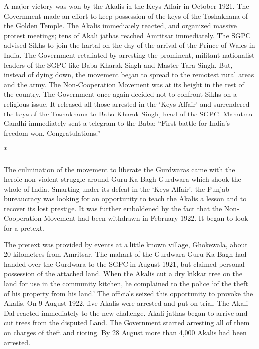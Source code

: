 \begin{multicols}{2}
A major victory was won by the Akalis in the Keys Affair in October 1921. The Government made an effort to keep possession of the keys of the Toshakhana of the Golden Temple. The Akalis immediately reacted, and organized massive protest meetings; tens of Akali jathas reached Amritsar immediately. The SGPC advised Sikhs to join the hartal on the day of the arrival of the Prince of Wales in India. The Government retaliated by arresting the prominent, militant nationalist leaders of the SGPC like Baba Kharak Singh and Master Tara Singh. But, instead of dying down, the movement began to spread to the remotest rural areas and the army. The Non-Cooperation Movement was at its height in the rest of the country. The Government once again decided not to confront Sikhs on a religious issue. It released all those arrested in the `Keys Affair' and surrendered the keys of the Toshakhana to Baba Kharak Singh, head of the SGPC. Mahatma Gandhi immediately sent a telegram to the Baba: ``First battle for India's freedom won. Congratulations.''

\begin{center}*\end{center}

\paragraph*{}
The culmination of the movement to liberate the Gurdwaras came with the heroic non-violent struggle around Guru-Ka-Bagh Gurdwara which shook the whole of India. Smarting under its defeat in the `Keys Affair', the Punjab bureaucracy was looking for an opportunity to teach the Akalis a lesson and to recover its lost prestige. It was further emboldened by the fact that the Non-Cooperation Movement had been withdrawn in February 1922. It began to look for a pretext.

The pretext was provided by events at a little known village, Ghokewala, about 20 kilometres from Amritsar. The mahant of the Gurdwara Guru-Ka-Bagh had handed over the Gurdwara to the SGPC in August 1921, but claimed personal possession of the attached land. When the Akalis cut a dry kikkar tree on the land for use in the community kitchen, he complained to the police `of the theft of his property from his land.' The officials seized this opportunity to provoke the Akalis. On 9 August 1922, five Akalis were arrested and put on trial. The Akali Dal reacted immediately to the new challenge. Akali jathas began to arrive and cut trees from the disputed Land. The Government started arresting all of them on charges of theft and rioting. By 28 August more than 4,000 Akalis had been arrested.


\end{multicols}
